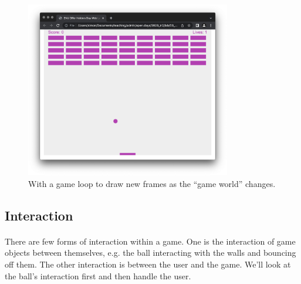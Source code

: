 \documentclass[10pt, a4paper, oneside]{article}
\begin{document}
\begin{figure}[H]
\centering
\includegraphics[width=0.8\textwidth]{images/03_gameloop+gameloop.png}
\caption{With a game loop to draw new frames as the ``game world'' changes.}
\label{fig:03_gameloop+gameloop}
\end{figure}


\subsection{Interaction}

\paragraph{} There are few forms of interaction within a game. One is the interaction of game objects between themselves, e.g. the ball interacting with the walls and bouncing off them. The other interaction is between the user and the game. We'll look at the ball's interaction first and then handle the user.
\end{document}
